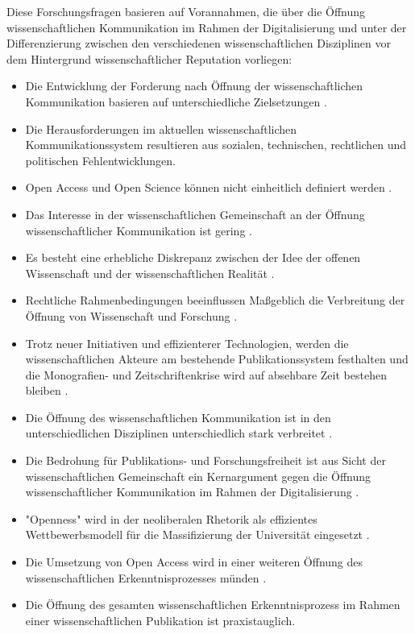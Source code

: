 Diese Forschungsfragen basieren auf Vorannahmen, die über die Öffnung wissenschaftlichen Kommunikation im Rahmen der Digitalisierung und unter der Differenzierung zwischen den verschiedenen wissenschaftlichen Disziplinen vor dem Hintergrund wissenschaftlicher Reputation vorliegen:
\begin{itemize}
\item Die Entwicklung der Forderung nach Öffnung der wissenschaftlichen Kommunikation basieren auf unterschiedliche Zielsetzungen \cite{suchen-Hoffmann-Zugang-undVerwertung-oeffentlicher-Informationen}.
\item Die Herausforderungen im aktuellen wissenschaftlichen Kommunikationssystem resultieren aus sozialen, technischen, rechtlichen und politischen Fehlentwicklungen.
\item Open Access und Open Science können nicht einheitlich definiert werden \cite{naeder_2010_open}.
\item Das Interesse in der wissenschaftlichen Gemeinschaft an der Öffnung wissenschaftlicher Kommunikation ist gering \cite{hagner_2015_sache_buches}.
\item Es besteht eine erhebliche Diskrepanz zwischen der Idee der offenen Wissenschaft und der wissenschaftlichen Realität \cite{Scheliga_2014}.
\item Rechtliche Rahmenbedingungen beeinflussen Maßgeblich die Verbreitung der Öffnung von Wissenschaft und Forschung \cite[:211]{Fehling_2014}.
\item Trotz neuer Initiativen und effizienterer Technologien, werden die wissenschaftlichen Akteure am bestehende Publikationssystem festhalten und die Monografien- und Zeitschriftenkrise wird auf absehbare Zeit bestehen bleiben \cite{Parks_2002_acadamic_faust} \cite{Goetting_2015}.
\item Die Öffnung des wissenschaftlichen Kommunikation ist in den unterschiedlichen Disziplinen unterschiedlich stark verbreitet \cite{EuropeanCommission_sciencepub_2006}.
\item Die Bedrohung für Publikations- und Forschungsfreiheit ist aus Sicht der wissenschaftlichen Gemeinschaft ein Kernargument gegen die Öffnung wissenschaftlicher Kommunikation im Rahmen der Digitalisierung \cite{siehe_unten}.
\item "Openness" wird in der neoliberalen Rhetorik als effizientes Wettbewerbsmodell für die Massifizierung der Universität eingesetzt \cite{tkacz_2012_open}.
\item Die Umsetzung von Open Access wird in einer weiteren Öffnung des wissenschaftlichen Erkenntnisprozesses münden \cite{siehe_unten}.
\item Die Öffnung des gesamten wissenschaftlichen Erkenntnisprozess im Rahmen einer wissenschaftlichen Publikation ist praxistauglich.
\end{itemize}

